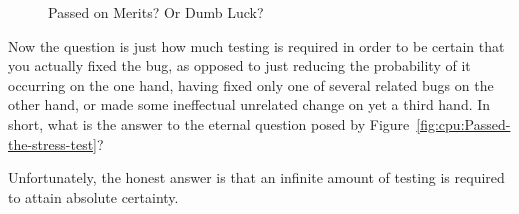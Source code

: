 \begin{figure}[tb]
\begin{center}
\end{center}
\caption{Passed on Merits?  Or Dumb Luck?}
\end{figure}

Now the question is just how much testing is required in order to be
certain that
you actually fixed the bug, as opposed to just reducing the probability
of it occurring on the one hand, having fixed only one of several
related bugs on the other hand, or made some ineffectual unrelated
change on yet a third hand.
In short, what is the answer to the eternal question posed by
Figure~\ref{fig:cpu:Passed-the-stress-test}?

Unfortunately, the honest answer is that an infinite amount of testing
is required to attain absolute certainty.

